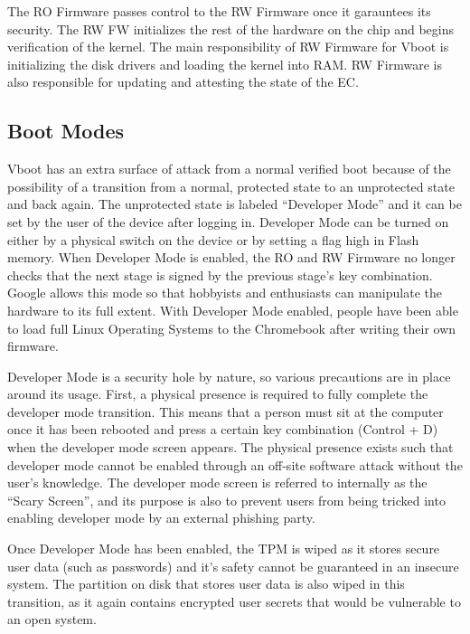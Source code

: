 \documentclass[../report.tex]{subfiles}
\begin{document}
The RO Firmware passes control to the RW Firmware once it garauntees its security.
The RW FW initializes the rest of the hardware on the chip and begins verification of the kernel.
The main responsibility of RW Firmware for Vboot is initializing the disk drivers and loading the kernel into RAM.
RW Firmware is also responsible for updating and attesting the state of the EC.

\subsection{Boot Modes}

Vboot has an extra surface of attack from a normal verified boot because of the possibility of a transition from a normal, protected state to an unprotected state and back again.
The unprotected state is labeled ``Developer Mode'' and it can be set by the user of the device after logging in. 
Developer Mode can be turned on either by a physical switch on the device or by setting a flag high in Flash memory.
When Developer Mode is enabled, the RO and RW Firmware no longer checks that the next stage is signed by the previous stage's key combination.
Google allows this mode so that hobbyists and enthusiasts can manipulate the hardware to its full extent.
With Developer Mode enabled, people have been able to load full Linux Operating Systems to the Chromebook after writing their own firmware.

Developer Mode is a security hole by nature, so various precautions are in place around its usage. 
First, a physical presence is required to fully complete the developer mode transition. 
This means that a person must sit at the computer once it has been rebooted and press a certain key combination (Control + D) when the developer mode screen appears.
The physical presence exists such that developer mode cannot be enabled through an off-site software attack without the user's knowledge.
The developer mode screen is referred to internally as the ``Scary Screen'', and its purpose is also to prevent users from being tricked into enabling developer mode by an external phishing party.

Once Developer Mode has been enabled, the TPM is wiped as it stores secure user data (such as passwords) and it's safety cannot be guaranteed in an insecure system.
The partition on disk that stores user data is also wiped in this transition, as it again contains encrypted user secrets that would be vulnerable to an open system.
\end{document}
